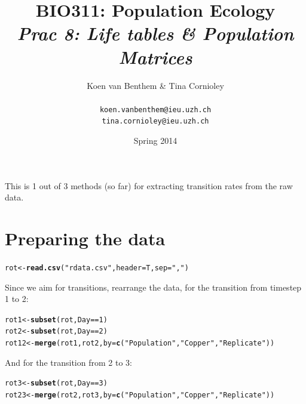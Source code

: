 \documentclass{article}\usepackage[]{graphicx}\usepackage[]{color}
\title{BIO311: Population Ecology\\ \textit{Prac 8: Life tables \& Population Matrices}}
\author{Koen van Benthem \& Tina Cornioley\\\\
\tt{koen.vanbenthem@ieu.uzh.ch}\\ \tt{tina.cornioley@ieu.uzh.ch}}
\date{Spring 2014}
\makeatletter
\newcommand{\hlnum}[1]{\textcolor[rgb]{0.686,0.059,0.569}{#1}}%
\newcommand{\hlstr}[1]{\textcolor[rgb]{0.192,0.494,0.8}{#1}}%
\newcommand{\hlopt}[1]{\textcolor[rgb]{0,0,0}{#1}}%
\newcommand{\hlstd}[1]{\textcolor[rgb]{0.345,0.345,0.345}{#1}}%
\newcommand{\hlkwb}[1]{\textcolor[rgb]{0.69,0.353,0.396}{#1}}%
\newcommand{\hlkwc}[1]{\textcolor[rgb]{0.333,0.667,0.333}{#1}}%
\newcommand{\hlkwd}[1]{\textcolor[rgb]{0.737,0.353,0.396}{\textbf{#1}}}%
\newenvironment{kframe}{%
 \def\at@end@of@kframe{}%
 \ifinner\ifhmode%
  \def\at@end@of@kframe{\end{minipage}}%
  \begin{minipage}{\columnwidth}%
 \fi\fi%
 \def\FrameCommand##1{\hskip\@totalleftmargin \hskip-\fboxsep
 \colorbox{shadecolor}{##1}\hskip-\fboxsep
     \hskip-\linewidth \hskip-\@totalleftmargin \hskip\columnwidth}%
 \MakeFramed {\advance\hsize-\width
   \@totalleftmargin\z@ \linewidth\hsize
   \@setminipage}}%
 {\par\unskip\endMakeFramed%
 \at@end@of@kframe}
\newenvironment{knitrout}{}{} %
\makeatother
\begin{document}
\maketitle
\tableofcontents
\vspace{3cm}
\newpage
This is 1 out of 3 methods (so far) for extracting transition rates from the raw data.
\section{Preparing the data}
\begin{knitrout}
\color{fgcolor}\begin{kframe}
\begin{alltt}
\hlstd{rot}\hlkwb{<-}\hlkwd{read.csv}\hlstd{(}\hlstr{"rdata.csv"}\hlstd{,}\hlkwc{header}\hlstd{=T,}\hlkwc{sep}\hlstd{=}\hlstr{","}\hlstd{)}
\end{alltt}
\end{kframe}
\end{knitrout}

Since we aim for transitions, rearrange the data, for the transition from timestep 1 to 2:
\begin{knitrout}
\color{fgcolor}\begin{kframe}
\begin{alltt}
\hlstd{rot1}\hlkwb{<-}\hlkwd{subset}\hlstd{(rot,Day}\hlopt{==}\hlnum{1}\hlstd{)}
\hlstd{rot2}\hlkwb{<-}\hlkwd{subset}\hlstd{(rot,Day}\hlopt{==}\hlnum{2}\hlstd{)}
\hlstd{rot12}\hlkwb{<-}\hlkwd{merge}\hlstd{(rot1,rot2,}\hlkwc{by}\hlstd{=}\hlkwd{c}\hlstd{(}\hlstr{"Population"}\hlstd{,}\hlstr{"Copper"}\hlstd{,}\hlstr{"Replicate"}\hlstd{))}
\end{alltt}
\end{kframe}
\end{knitrout}

And for the transition from 2 to 3:
\begin{knitrout}
\color{fgcolor}\begin{kframe}
\begin{alltt}
\hlstd{rot3}\hlkwb{<-}\hlkwd{subset}\hlstd{(rot,Day}\hlopt{==}\hlnum{3}\hlstd{)}
\hlstd{rot23}\hlkwb{<-}\hlkwd{merge}\hlstd{(rot2,rot3,}\hlkwc{by}\hlstd{=}\hlkwd{c}\hlstd{(}\hlstr{"Population"}\hlstd{,}\hlstr{"Copper"}\hlstd{,}\hlstr{"Replicate"}\hlstd{))}
\end{alltt}
\end{kframe}
\end{knitrout}
\end{document}
